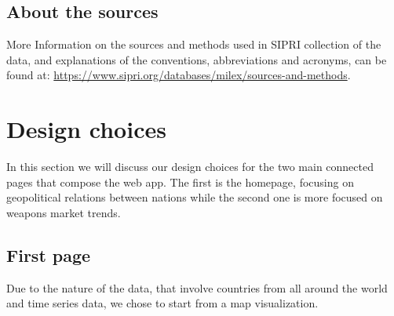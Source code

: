 \documentclass{article}
\begin{document}
\begin{multicols}{2}
\begin{center}
\begin{table}[hbt!]
\label{tab:d2}

\caption { \label { tab:d2} Attributes of dataset in \texttt{importNumbers1989-2018.csv} file.   }

\end{table}


\end{center}

\subsection{About the sources}
More Information on the sources and methods used in SIPRI collection of the data, and explanations of the conventions, abbreviations and acronyms, can be found at: \url{https://www.sipri.org/databases/milex/sources-and-methods}.


\section{Design choices}
%

In this section we will discuss our design choices for the two main connected pages that compose the web app. The first is the homepage, focusing on geopolitical relations between nations while the second one is more focused on weapons market trends.

\subsection{First page}
Due to the nature of the data, that involve countries from all around the world and time series data, we chose to start from a map visualization.



\end{multicols}
\end{document}
